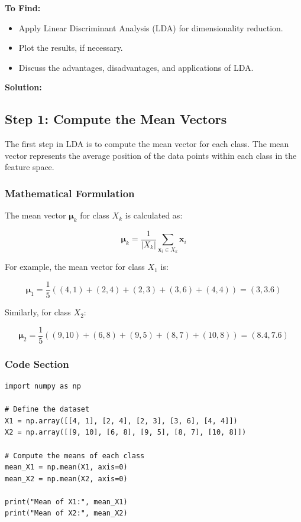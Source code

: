 \documentclass{exam}
\begin{document}
\textbf{To Find:} 
\begin{itemize}
    \item Apply Linear Discriminant Analysis (LDA) for dimensionality reduction.
    \item Plot the results, if necessary.
    \item Discuss the advantages, disadvantages, and applications of LDA.
\end{itemize}

\textbf{Solution:}

\subsection{Step 1: Compute the Mean Vectors}

The first step in LDA is to compute the mean vector for each class. The mean vector represents the average position of the data points within each class in the feature space.

\subsubsection*{Mathematical Formulation}

The mean vector \( \mathbf{\mu}_k \) for class \( X_k \) is calculated as:

\[
\mathbf{\mu}_k = \frac{1}{|X_k|} \sum_{\mathbf{x}_i \in X_k} \mathbf{x}_i
\]

For example, the mean vector for class \( X_1 \) is:

\[
\mathbf{\mu}_1 = \frac{1}{5} \left( (4,1) + (2,4) + (2,3) + (3,6) + (4,4) \right) = (3, 3.6)
\]

Similarly, for class \( X_2 \):

\[
\mathbf{\mu}_2 = \frac{1}{5} \left( (9,10) + (6,8) + (9,5) + (8,7) + (10,8) \right) = (8.4, 7.6)
\]

\subsubsection*{Code Section}

\begin{verbatim}
import numpy as np

# Define the dataset
X1 = np.array([[4, 1], [2, 4], [2, 3], [3, 6], [4, 4]])
X2 = np.array([[9, 10], [6, 8], [9, 5], [8, 7], [10, 8]])

# Compute the means of each class
mean_X1 = np.mean(X1, axis=0)
mean_X2 = np.mean(X2, axis=0)

print("Mean of X1:", mean_X1)
print("Mean of X2:", mean_X2)
\end{verbatim}
\end{document}
